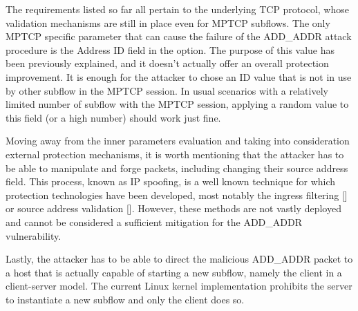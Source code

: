 The requirements listed so far all pertain to the underlying TCP protocol, whose validation mechanisms are still in place even for MPTCP subflows. The only MPTCP specific parameter that can cause the failure of the ADD\_ADDR attack procedure is the Address ID field in the option. The purpose of this value has been previously explained, and it doesn't actually offer an overall protection improvement. It is enough for the attacker to chose an ID value that is not in use by other subflow in the MPTCP session. In usual scenarios with a relatively limited number of subflow with the MPTCP session, applying a random value to this field (or a high number) should work just fine.

Moving away from the inner parameters evaluation and taking into consideration external protection mechanisms, it is worth mentioning that the attacker has to be able to manipulate and forge packets, including changing their source address field. This process, known as IP spoofing, is a well known technique for which protection technologies have been developed, most notably the ingress filtering [] or source address validation []. However, these methods are not vastly deployed and cannot be considered a sufficient mitigation for the ADD\_ADDR vulnerability. %

Lastly, the attacker has to be able to direct the malicious ADD\_ADDR packet to a host that is actually capable of starting a new subflow, namely the client in a client-server model. The current Linux kernel implementation prohibits the server to instantiate a new subflow and only the client does so.
